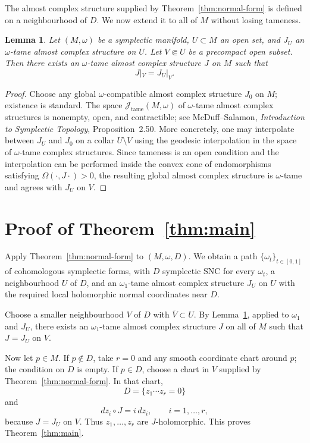 \documentclass[11pt]{article}
\newtheorem{lemma}[theorem]{Lemma}
\theoremstyle{definition}
\numberwithin{equation}{section}
\begin{document}
The almost complex structure supplied by Theorem~\ref{thm:normal-form} is defined on a neighbourhood of $D$.  We now extend it to all of $M$ without losing tameness.

\begin{lemma}\label{lem:extend}
Let $(M,\omega)$ be a symplectic manifold, $U\subset M$ an open set, and $J_U$ an $\omega$-tame almost complex structure on $U$.  Let $V\Subset U$ be a precompact open subset.  Then there exists an $\omega$-tame almost complex structure $J$ on $M$ such that
\[
J|_V=J_U|_V.
\]
\end{lemma}

\begin{proof}
Choose any global $\omega$-compatible almost complex structure $J_0$ on $M$; existence is standard.  The space $\mathcal J_{\mathrm{tame}}(M,\omega)$ of $\omega$-tame almost complex structures is nonempty, open, and contractible; see McDuff--Salamon, \emph{Introduction to Symplectic Topology}, Proposition~2.50.  More concretely, one may interpolate between $J_U$ and $J_0$ on a collar $U\setminus V$ using the geodesic interpolation in the space of $\omega$-tame complex structures.  Since tameness is an open condition and the interpolation can be performed inside the convex cone of endomorphisms satisfying $\Omega(\cdot,J\cdot)>0$, the resulting global almost complex structure is $\omega$-tame and agrees with $J_U$ on $V$.
\end{proof}

\section{Proof of Theorem~\ref{thm:main}}

Apply Theorem~\ref{thm:normal-form} to $(M,\omega,D)$.  We obtain a path $\{\omega_t\}_{t\in[0,1]}$ of cohomologous symplectic forms, with $D$ symplectic SNC for every $\omega_t$, a neighbourhood $U$ of $D$, and an $\omega_1$-tame almost complex structure $J_U$ on $U$ with the required local holomorphic normal coordinates near $D$.

Choose a smaller neighbourhood $V$ of $D$ with $\overline V\subset U$.  By Lemma~\ref{lem:extend}, applied to $\omega_1$ and $J_U$, there exists an $\omega_1$-tame almost complex structure $J$ on all of $M$ such that $J=J_U$ on $V$.

Now let $p\in M$.  If $p\notin D$, take $r=0$ and any smooth coordinate chart around $p$; the condition on $D$ is empty.  If $p\in D$, choose a chart in $V$ supplied by Theorem~\ref{thm:normal-form}.  In that chart,
\[
D=\{z_1\cdots z_r=0\}
\]
and
\[
dz_i\circ J=i\,dz_i,\qquad i=1,\dots,r,
\]
because $J=J_U$ on $V$.  Thus $z_1,\dots,z_r$ are $J$-holomorphic.  This proves Theorem~\ref{thm:main}.
\end{document}
